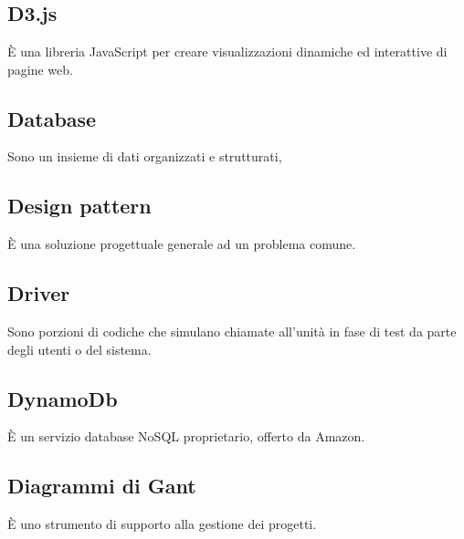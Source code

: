 \section{}
\subsection*{D3.js} È una libreria JavaScript per creare visualizzazioni dinamiche ed interattive di pagine web.

\subsection*{Database} Sono un insieme di dati organizzati e strutturati,

\subsection*{Design pattern} È una soluzione progettuale generale ad un problema comune.

\subsection*{Driver} Sono porzioni di codiche che simulano chiamate all'unità in fase di test da parte degli utenti o del sistema.

\subsection*{DynamoDb} È un servizio database NoSQL proprietario, offerto da Amazon.

\subsection*{Diagrammi di Gant} È uno strumento di supporto alla gestione dei progetti.